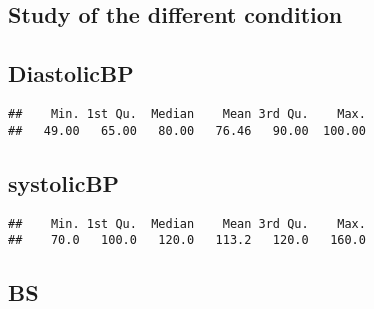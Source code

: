 \documentclass[
]{article}
\newenvironment{Shaded}{\begin{snugshade}}{\end{snugshade}}
\newcommand{\FunctionTok}[1]{\textcolor[rgb]{0.00,0.00,0.00}{#1}}
\newcommand{\NormalTok}[1]{#1}
\newcommand{\SpecialCharTok}[1]{\textcolor[rgb]{0.00,0.00,0.00}{#1}}
\begin{document}
\hypertarget{study-of-the-different-condition}{%
\subsection{Study of the different
condition}\label{study-of-the-different-condition}}

\hypertarget{diastolicbp}{%
\subsection{DiastolicBP}\label{diastolicbp}}

\begin{Shaded}
\end{Shaded}

\begin{verbatim}
##    Min. 1st Qu.  Median    Mean 3rd Qu.    Max. 
##   49.00   65.00   80.00   76.46   90.00  100.00
\end{verbatim}

\hypertarget{systolicbp}{%
\subsection{systolicBP}\label{systolicbp}}

\begin{Shaded}
\end{Shaded}

\begin{verbatim}
##    Min. 1st Qu.  Median    Mean 3rd Qu.    Max. 
##    70.0   100.0   120.0   113.2   120.0   160.0
\end{verbatim}

\hypertarget{bs}{%
\subsection{BS}\label{bs}}

\begin{Shaded}
\end{Shaded}
\end{document}
